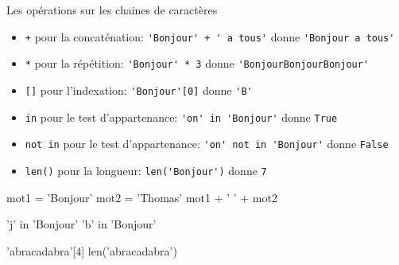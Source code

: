 \begin{easybox}{Les opérations sur les chaines de caractères}{}   
    \smallskip
    \begin{itemize}
        \item[] \texttt{+} \quad pour la concaténation:  \verb~'Bonjour' + ' a tous'~ donne \verb~'Bonjour a tous'~
        \item[] \texttt{*} \quad pour la répétition:  \verb~'Bonjour' * 3~ donne \verb~'BonjourBonjourBonjour'~
        \item[] \texttt{[]} \quad pour l'indexation:  \verb~'Bonjour'[0]~ donne \verb~'B'~
        \item[] \texttt{in} \quad pour le test d'appartenance:  \verb~'on' in 'Bonjour'~ donne \verb~True~
        \item[] \texttt{not in} \quad pour le test d'appartenance:  \verb~'on' not in 'Bonjour'~ donne \verb~False~
        \item[] \texttt{len()} \quad pour la longueur:  \verb~len('Bonjour')~ donne \verb~7~
       
    \end{itemize}
\end{easybox}


\begin{minipage}[t]{0.32\linewidth}
    \begin{ConsolePythontex}[ Label=false]{}
        mot1 = 'Bonjour'
        mot2 = 'Thomas'
        mot1 + ' ' + mot2
    \end{ConsolePythontex}
\end{minipage}\hfill
\begin{minipage}[t]{0.32\linewidth}
    \begin{ConsolePythontex}[ Label=false]{}
        'j' in 'Bonjour'
        'b' in 'Bonjour'
    \end{ConsolePythontex}
\end{minipage}\hfill{}
\begin{minipage}[t]{0.32\linewidth}
    \begin{ConsolePythontex}[ Label=false]{}
        'abracadabra'[4]
        len('abracadabra')
    \end{ConsolePythontex}
\end{minipage}

